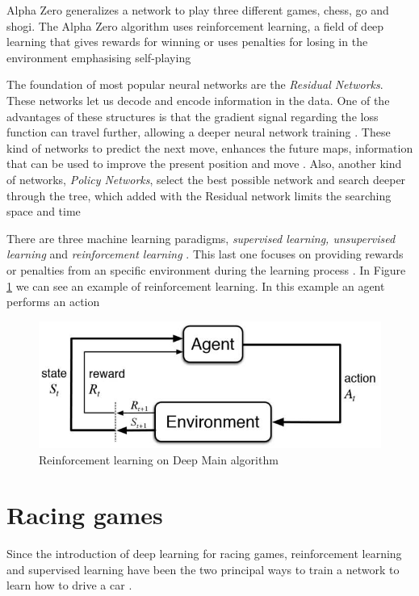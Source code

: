 \documentclass[conference]{IEEEtran}
\begin{document}
Alpha Zero generalizes a network to play three different games, chess, go and shogi. The Alpha Zero algorithm uses reinforcement learning, a field of deep learning that gives rewards for winning or uses penalties for losing in the environment emphasising self-playing \cite{how}

The foundation of most popular neural networks are the \textit{Residual Networks}. These networks let us decode and encode information in the data. One of the advantages of these structures is that the gradient signal regarding the loss function can travel further, allowing a deeper neural network training \cite{how}. These kind of networks to predict the next move, enhances the future maps, information that can be used to improve the present position and move \cite{how}. Also, another kind of networks, \textit{Policy Networks}, select the best possible network and search deeper through the tree, which added with the Residual network limits the searching space and time \cite{how}

There are three machine learning paradigms, \textit{supervised learning, unsupervised learning} and \textit{reinforcement learning} \cite{how}. This last one focuses on providing rewards or penalties from an specific environment during the learning process \cite{how}. In Figure \ref{chess:reinforcement} we can see an example of reinforcement learning. In this example an agent performs an action 

\begin{figure}[h]
\includegraphics[scale=0.52]{img/deepchess}
\caption{Reinforcement learning on Deep Main algorithm \cite{how}}
\label{chess:reinforcement}
\end{figure}





\section{Racing games}

Since the introduction of deep learning for racing games, reinforcement learning and supervised learning have been the two principal ways to train a network to learn how to drive a car \cite{racingpdf}.
\end{document}
